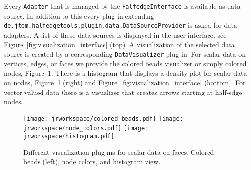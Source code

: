 \documentclass[Thesis.tex]{subfiles}
\begin{document}
Every {\tt Adapter} that is managed by the {\tt HalfedgeInterface} is available as data source. In 
addition to this every plug-in extending {\tt de.jtem.half\-edgetools.plugin.data.Data\-Source\-Provider} 
is asked for data adapters. A list of these data sources is displayed in the user interface, see 
Figure~\ref{fig:visualization_interface} (top). A visualization of the selected data source is created by a
corresponding {\tt DataVisualizer} plug-in. For scalar data on vertices, edges, or faces we provide the 
colored beads visualizer or simply colored nodes, Figure~\ref{fig:visualizers}. There is a histogram that displays a density
plot for scalar data on nodes, Figure~\ref{fig:visualizers} (right) and Figure~\ref{fig:visualization_interface} (bottom). For vector valued data 
there is a visualizer that creates arrows starting at half-edge nodes.


\begin{figure}
	\centering
	\texttt{[image: jrworkspace/colored\_beads.pdf]}
	\texttt{[image: jrworkspace/node\_colors.pdf]}
	\texttt{[image: jrworkspace/histogram.pdf]}
	\caption[Visualizers]{Different visualization plug-ins for scalar data on faces. Colored beads (left),
		node colors, and histogram view.}
	\label{fig:visualizers}
\end{figure}

\subfilebibliography
\end{document}
